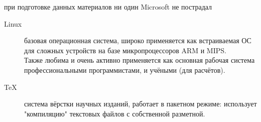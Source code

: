 
при подготовке данных материалов ни один Microsoft не пострадал

\begin{description}
    \item[Linux] базовая операционная система, широко применяется как
    встраиваемая ОС для сложных устройств на базе микропроцессоров ARM и
    MIPS.\\Также любима и очень активно применяется как основная рабочая система
    профессиональными программистами, и учёными (для расчётов).
    \item[\TeX] система вёрстки научных изданий, работает в пакетном режиме:
    использует "компиляцию" текстовых файлов с собственной разметной.
\end{description}
